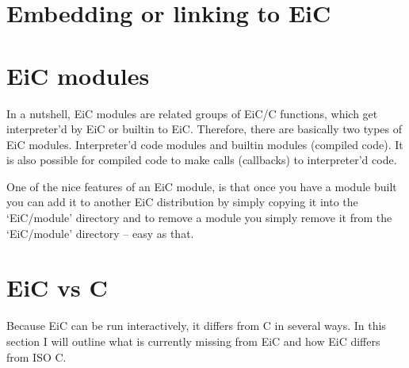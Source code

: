 \documentclass[12pt]{report}
\begin{document}
\section{Embedding or linking to EiC}



\section{EiC modules}

In a nutshell, EiC modules are related groups of EiC/C functions,
which get interpreter'd by EiC or builtin to EiC.  Therefore, there
are basically two types of EiC modules. Interpreter'd code modules and
builtin modules (compiled code). It is also possible for compiled code
to make calls (callbacks) to interpreter'd code.


One of the nice features of an EiC module, is that once you have a
module built you can add it to another EiC distribution by simply
copying it into the `EiC/module' directory and to remove a module you
simply remove it from the `EiC/module' directory -- easy as that.

\section{ EiC vs C}

Because EiC can be run interactively, it differs from C in several
ways. In this section I will outline what is currently
missing from EiC and how EiC differs from ISO C. 
\end{document}
